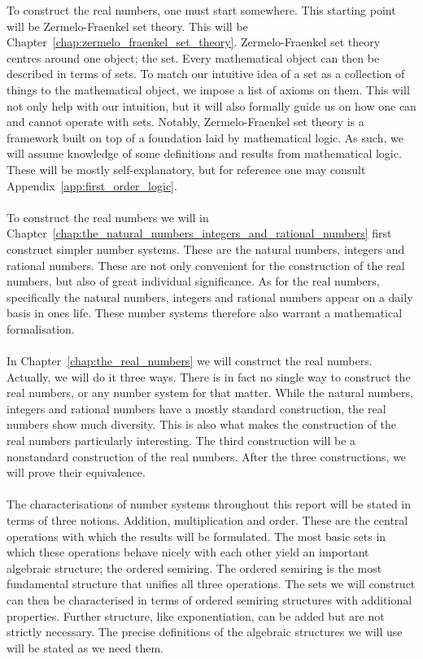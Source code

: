 \documentclass[../main.tex]{subfiles}
\begin{document}
To construct the real numbers, one must start somewhere. This starting point will be Zermelo-Fraenkel set theory. This will be Chapter~\ref{chap:zermelo_fraenkel_set_theory}. Zermelo-Fraenkel set theory centres around one object; the set. Every mathematical object can then be described in terms of sets. To match our intuitive idea of a set as a collection of things to the mathematical object, we impose a list of axioms on them. This will not only help with our intuition, but it will also formally guide us on how one can and cannot operate with sets. Notably, Zermelo-Fraenkel set theory is a framework built on top of a foundation laid by mathematical logic. As such, we will assume knowledge of some definitions and results from mathematical logic. These will be mostly self-explanatory, but for reference one may consult Appendix~\ref{app:first_order_logic}. \\\\
To construct the real numbers we will in Chapter~\ref{chap:the_natural_numbers_integers_and_rational_numbers} first construct simpler number systems. These are the natural numbers, integers and rational numbers. These are not only convenient for the construction of the real numbers, but also of great individual significance. As for the real numbers, specifically the natural numbers, integers and rational numbers appear on a daily basis in ones life. These number systems therefore also warrant a mathematical formalisation. \\\\
In Chapter~\ref{chap:the_real_numbers} we will construct the real numbers. Actually, we will do it three ways. There is in fact no single way to construct the real numbers, or any number system for that matter. While the natural numbers, integers and rational numbers have a mostly standard construction, the real numbers show much diversity. This is also what makes the construction of the real numbers particularly interesting. The third construction will be a nonstandard construction of the real numbers. After the three constructions, we will prove their equivalence. \\\\
The characterisations of number systems throughout this report will be stated in terms of three notions. Addition, multiplication and order. These are the central operations with which the results will be formulated. The most basic sets in which these operations behave nicely with each other yield an important algebraic structure; the ordered semiring. The ordered semiring is the most fundamental structure that unifies all three operations. The sets we will construct can then be characterised in terms of ordered semiring structures with additional properties. Further structure, like exponentiation, can be added but are not strictly necessary. The precise definitions of the algebraic structures we will use will be stated as we need them. \\\\
\end{document}
